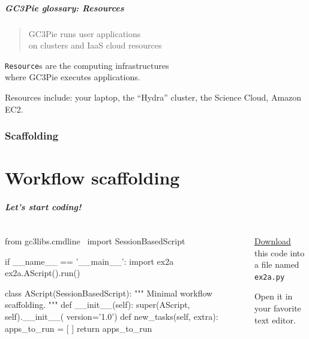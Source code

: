 \documentclass[english,serif,mathserif,xcolor=pdftex,dvipsnames,table]{beamer}
\begin{document}
\begin{frame}
  \frametitle{GC3Pie glossary: Resources}
  \begin{quote}
    GC3Pie runs user applications
    \\
    on clusters and IaaS cloud \alert{resources}
  \end{quote}

  \+ \alert{\texttt{Resource}s are the computing infrastructures \\ where GC3Pie executes applications.}

  \+ Resources include: your laptop, the ``Hydra'' cluster, the Science Cloud, Amazon EC2.
\end{frame}


\section{Scaffolding}
\part{Workflow scaffolding}

\begin{frame}[fragile]
  \frametitle{Let's start coding!}
  \begin{columns}
    \begin{column}{0.7\linewidth}
\begin{python}
from gc3libs.cmdline \
  import SessionBasedScript

if __name__ == '__main__':
  import ex2a
  ex2a.AScript().run()

class AScript(SessionBasedScript):
  """
  Minimal workflow scaffolding.
  """
  def __init__(self):
    super(AScript, self).__init__(
        version='1.0')
  def new_tasks(self, extra):
    apps_to_run = [ ]
    return apps_to_run
\end{python}
    \end{column}
    \begin{column}{0.3\linewidth}
      \href{https://raw.githubusercontent.com/uzh/gc3pie/master/docs/programmers/tutorials/workflows/solutions/ex2a.py}{Download} this code into a file named \texttt{ex2a.py}

      \+
      Open it in your favorite text editor.
    \end{column}
  \end{columns}
\end{frame}
\end{document}
